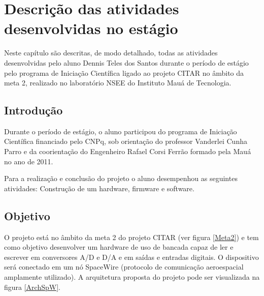 \chapter{Descrição das atividades desenvolvidas no estágio}
Neste capítulo são descritas, de modo detalhado, todas as atividades desenvolvidas pelo aluno Dennis Teles dos Santos durante o período de estágio pelo programa de Iniciação Científica ligado ao projeto CITAR no âmbito da meta 2, realizado no laboratório NSEE do Instituto Mauá de Tecnologia.

\section{Introdução}
Durante o período de estágio, o aluno participou do programa de Iniciação Científica financiado pelo CNPq, sob orientação do professor Vanderlei Cunha Parro e da coorientação do Engenheiro Rafael Corsi Ferrão formado pela Mauá no ano de 2011.

Para a realização e conclusão do projeto o aluno desempenhou as seguintes atividades: Construção de um hardware, firmware e software.

\section{Objetivo}

O projeto está no âmbito da meta 2 do projeto CITAR (ver figura \ref{Meta2}) e tem como objetivo desenvolver um hardware de uso de bancada capaz de ler e escrever em conversores A/D e D/A e em saídas e entradas digitais. O dispositivo será conectado em um nó SpaceWire (protocolo de comunicação aeroespacial amplamente utilizado). A arquitetura proposta do projeto pode ser visualizada na figura \ref{ArchSpW}.


